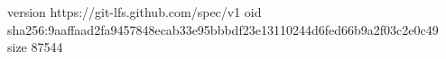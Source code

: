 version https://git-lfs.github.com/spec/v1
oid sha256:9aaffaad2fa9457848ecab33e95bbbdf23e13110244d6fed66b9a2f03c2e0c49
size 87544
